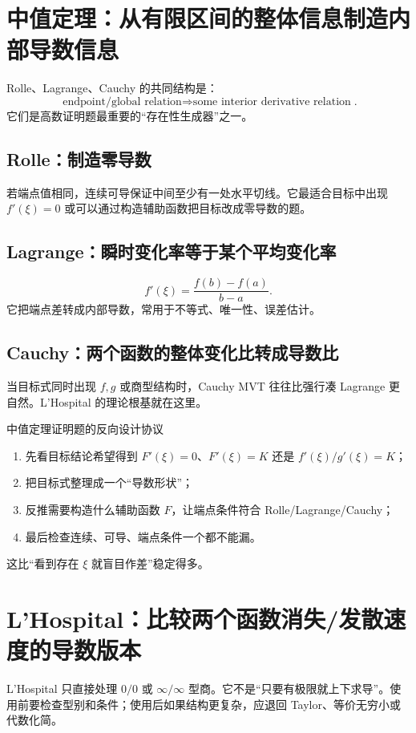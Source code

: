 \documentclass[11pt,a4paper,openany]{ctexbook}
\begin{document}
\section{中值定理：从有限区间的整体信息制造内部导数信息}
Rolle、Lagrange、Cauchy 的共同结构是：
\[
\boxed{\text{endpoint/global relation}\Longrightarrow \text{some interior derivative relation}}.
\]
它们是高数证明题最重要的“存在性生成器”之一。

\subsection{Rolle：制造零导数}
若端点值相同，连续可导保证中间至少有一处水平切线。它最适合目标中出现 $f'(\xi)=0$ 或可以通过构造辅助函数把目标改成零导数的题。

\subsection{Lagrange：瞬时变化率等于某个平均变化率}
\[
f'(\xi)=\frac{f(b)-f(a)}{b-a}.
\]
它把端点差转成内部导数，常用于不等式、唯一性、误差估计。

\subsection{Cauchy：两个函数的整体变化比转成导数比}
当目标式同时出现 $f,g$ 或商型结构时，Cauchy MVT 往往比强行凑 Lagrange 更自然。L'Hospital 的理论根基就在这里。

\begin{methodbox}{中值定理证明题的反向设计协议}
\begin{enumerate}
  \item 先看目标结论希望得到 $F'(\xi)=0$、$F'(\xi)=K$ 还是 $f'(\xi)/g'(\xi)=K$；
  \item 把目标式整理成一个“导数形状”；
  \item 反推需要构造什么辅助函数 $F$，让端点条件符合 Rolle/Lagrange/Cauchy；
  \item 最后检查连续、可导、端点条件一个都不能漏。
\end{enumerate}
这比“看到存在 $\xi$ 就盲目作差”稳定得多。
\end{methodbox}

\section{L'Hospital：比较两个函数消失/发散速度的导数版本}
L'Hospital 只直接处理 $0/0$ 或 $\infty/\infty$ 型商。它不是“只要有极限就上下求导”。使用前要检查型别和条件；使用后如果结构更复杂，应退回 Taylor、等价无穷小或代数化简。
\end{document}
